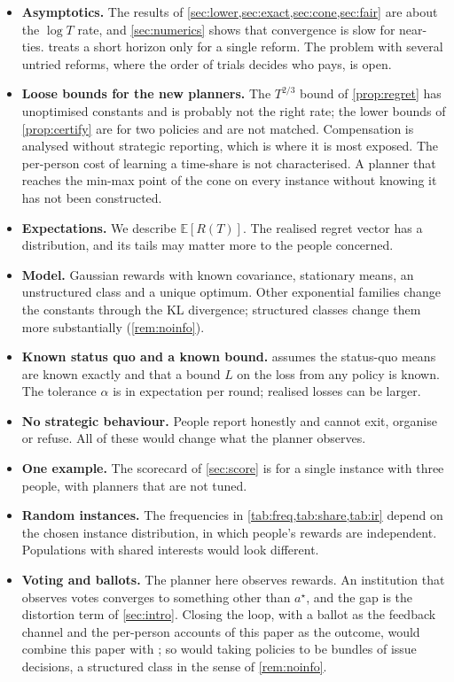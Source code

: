 \documentclass[11pt,a4paper]{article}
\theoremstyle{plain}
\theoremstyle{definition}
\theoremstyle{remark}
\newcommand{\E}{\mathbb{E}}
\newcommand{\astar}{a^\star}
\begin{document}
\begin{itemize}[leftmargin=*,itemsep=2pt]
  \item \textbf{Asymptotics.} The results of \cref{sec:lower,sec:exact,sec:cone,sec:fair} are about the $\log T$ rate, and \cref{sec:numerics} shows that convergence is slow for near-ties.  treats a short horizon only for a single reform. The problem with several untried reforms, where the order of trials decides who pays, is open.
  \item \textbf{Loose bounds for the new planners.} The $T^{2/3}$ bound of \cref{prop:regret} has unoptimised constants and is probably not the right rate; the lower bounds of \cref{prop:certify} are for two policies and are not matched. Compensation is analysed without strategic reporting, which is where it is most exposed. The per-person cost of learning a time-share is not characterised. A planner that reaches the min-max point of the cone on every instance without knowing it has not been constructed.
  \item \textbf{Expectations.} We describe $\E[R(T)]$. The realised regret vector has a distribution, and its tails may matter more to the people concerned.
  \item \textbf{Model.} Gaussian rewards with known covariance, stationary means, an unstructured class and a unique optimum. Other exponential families change the constants through the KL divergence; structured classes change them more substantially (\cref{rem:noinfo}).
  \item \textbf{Known status quo and a known bound.}  assumes the status-quo means are known exactly and that a bound $L$ on the loss from any policy is known. The tolerance $\alpha$ is in expectation per round; realised losses can be larger.
  \item \textbf{No strategic behaviour.} People report honestly and cannot exit, organise or refuse. All of these would change what the planner observes.
  \item \textbf{One example.} The scorecard of \cref{sec:score} is for a single instance with three people, with planners that are not tuned.
  \item \textbf{Random instances.} The frequencies in \cref{tab:freq,tab:share,tab:ir} depend on the chosen instance distribution, in which people's rewards are independent. Populations with shared interests would look different.
  \item \textbf{Voting and ballots.} The planner here observes rewards. An institution that observes votes converges to something other than $\astar$, and the gap is the distortion term of \cref{sec:intro}. Closing the loop, with a ballot as the feedback channel and the per-person accounts of this paper as the outcome, would combine this paper with \cite{telfar2026}; so would taking policies to be bundles of issue decisions, a structured class in the sense of \cref{rem:noinfo}.
\end{itemize}



\end{document}
